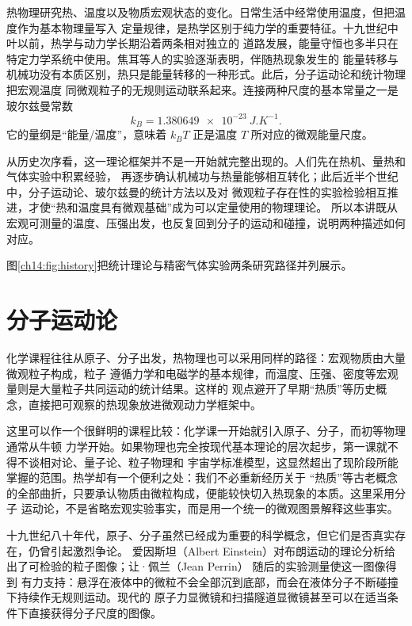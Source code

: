 {热物理研究热、温度以及物质宏观状态的变化。日常生活中经常使用温度，但把温度作为基本物理量写入
定量规律，是热学区别于纯力学的重要特征。十九世纪中叶以前，热学与动力学长期沿着两条相对独立的
道路发展，能量守恒也多半只在特定力学系统中使用。焦耳等人的实验逐渐表明，伴随热现象发生的
能量转移与机械功没有本质区别，热只是能量转移的一种形式。此后，分子运动论和统计物理把宏观温度
同微观粒子的无规则运动联系起来。连接两种尺度的基本常量之一是玻尔兹曼常数
\begin{equation}
  \boxed{k_B=\SI{1.380649e-23}{J.K^{-1}}}.
\end{equation}
它的量纲是“能量/温度”，意味着 $k_BT$ 正是温度 $T$ 所对应的微观能量尺度。

从历史次序看，这一理论框架并不是一开始就完整出现的。人们先在热机、量热和气体实验中积累经验，
再逐步确认机械功与热量能够相互转化；此后近半个世纪中，分子运动论、玻尔兹曼的统计方法以及对
微观粒子存在性的实验检验相互推进，才使“热和温度具有微观基础”成为可以定量使用的物理理论。
所以本讲既从宏观可测量的温度、压强出发，也反复回到分子的运动和碰撞，说明两种描述如何对应。

图\ref{ch14:fig:history}把统计理论与精密气体实验两条研究路径并列展示。
\boltzmannRayleighContext

\section{分子运动论}\label{ch14:sec:molecules}

化学课程往往从原子、分子出发，热物理也可以采用同样的路径：宏观物质由大量微观粒子构成，粒子
遵循力学和电磁学的基本规律，而温度、压强、密度等宏观量则是大量粒子共同运动的统计结果。这样的
观点避开了早期“热质”等历史概念，直接把可观察的热现象放进微观动力学框架中。

这里可以作一个很鲜明的课程比较：化学课一开始就引入原子、分子，而初等物理通常从牛顿
力学开始。如果物理也完全按现代基本理论的层次起步，第一课就不得不谈相对论、量子论、粒子物理和
宇宙学标准模型，这显然超出了现阶段所能掌握的范围。热学却有一个便利之处：我们不必重新经历关于
“热质”等古老概念的全部曲折，只要承认物质由微粒构成，便能较快切入热现象的本质。这里采用分子
运动论，不是省略宏观实验事实，而是用一个统一的微观图景解释这些事实。

十九世纪八十年代，原子、分子虽然已经成为重要的科学概念，但它们是否真实存在，仍曾引起激烈争论。
爱因斯坦（Albert Einstein）对布朗运动的理论分析给出了可检验的粒子图像；让·佩兰（Jean Perrin） 随后的实验测量使这一图像得到
有力支持：悬浮在液体中的微粒不会全部沉到底部，而会在液体分子不断碰撞下持续作无规则运动。现代的
原子力显微镜和扫描隧道显微镜甚至可以在适当条件下直接获得分子尺度的图像。

}
